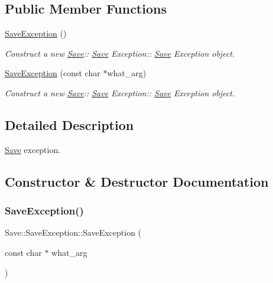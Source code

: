 \subsection*{Public Member Functions}
\begin{DoxyCompactItemize}
\item 
\mbox{\label{class_save_1_1_save_exception_a810c4df218e367a7e2dd67cd3f236a93}} 
\hyperlink{class_save_1_1_save_exception_a810c4df218e367a7e2dd67cd3f236a93}{Save\+Exception} ()
\begin{DoxyCompactList}\small\item\em Construct a new \hyperlink{class_save}{Save}\+:\+: \hyperlink{class_save}{Save} Exception\+:\+: \hyperlink{class_save}{Save} Exception object. \end{DoxyCompactList}\item 
\hyperlink{class_save_1_1_save_exception_a104fbf4c39ed76131af9dc508109a307}{Save\+Exception} (const char $\ast$what\+\_\+arg)
\begin{DoxyCompactList}\small\item\em Construct a new \hyperlink{class_save}{Save}\+:\+: \hyperlink{class_save}{Save} Exception\+:\+: \hyperlink{class_save}{Save} Exception object. \end{DoxyCompactList}\end{DoxyCompactItemize}


\subsection{Detailed Description}
\hyperlink{class_save}{Save} exception. 

\subsection{Constructor \& Destructor Documentation}
\mbox{\label{class_save_1_1_save_exception_a104fbf4c39ed76131af9dc508109a307}} 
\subsubsection{\texorpdfstring{Save\+Exception()}{SaveException()}}
{\footnotesize\ttfamily Save\+::\+Save\+Exception\+::\+Save\+Exception (\begin{DoxyParamCaption}\item[{const char $\ast$}]{what\+\_\+arg }\end{DoxyParamCaption})\hspace{0.3cm}{\ttfamily [explicit]}}



